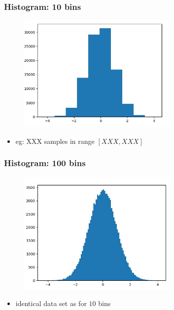 \documentclass[english,14pt]{beamer}
\begin{document}
\begin{frame}[fragile]

\frametitle{Histogram: 10 bins}

\begin{figure}[ht]
	\centering
	\includegraphics[width=0.7\textwidth]{figures/hist10BinsExample}
\end{figure}

\begin{itemize}
	\item eg: XXX samples in range $[XXX,XXX]$
\end{itemize}

\end{frame}


\begin{frame}[fragile]

\frametitle{Histogram: 100 bins}

\begin{figure}[ht]
	\centering
	\includegraphics[width=0.7\textwidth]{figures/hist100BinsExample}
\end{figure}

\begin{itemize}
	\item identical data set as for $10$ bins
\end{itemize}

\end{frame}
\end{document}
